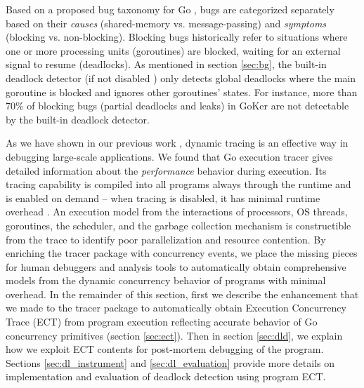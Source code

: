 Based on a proposed bug taxonomy for Go \cite{tu-concurrentBugs-asplos19}, bugs are categorized separately based on their \textit{causes} (shared-memory vs. message-passing) and \textit{symptoms} (blocking vs. non-blocking).
%
Blocking bugs historically refer to situations where one or more processing units (\eg goroutines) are blocked, waiting for an external signal to resume (\ie deadlocks).
%
As mentioned in section \ref{sec:bg}, the built-in deadlock detector (if not disabled \cite{go-netDeadlock}) only detects global deadlocks where the main goroutine is blocked and ignores other goroutines' states. For instance, more than 70\% of blocking bugs (partial deadlocks and leaks) in GoKer \cite{GoKer} are not detectable by the built-in deadlock detector.
%

As we have shown in our previous work \cite{parlot,difftrace}, dynamic tracing is an effective way in debugging large-scale applications.
%
We found that Go execution tracer \cite{go-cmd-trace} gives detailed information about the \textit{performance} behavior during execution.
%
Its tracing capability is compiled into all programs always through the runtime and is enabled on demand -- when tracing is disabled, it has minimal runtime overhead \cite{go-exec-tracer-doc}.
%
An execution model from the interactions of processors, OS threads, goroutines, the scheduler, and the garbage collection mechanism is constructible from the trace to identify poor parallelization and resource contention.
%
By enriching the tracer package with concurrency events, we place the missing pieces for human debuggers and analysis tools to automatically obtain comprehensive models from the dynamic concurrency behavior of programs with minimal overhead.
%
In the remainder of this section, first we describe the enhancement that we made to the tracer package to automatically obtain Execution Concurrency Trace (ECT) from program execution reflecting accurate behavior of Go concurrency primitives (section \ref{sec:ect}).
%
Then in section \ref{sec:dld}, we explain how we exploit ECT contents for post-mortem debugging of the program.
%
Sections \ref{sec:dl_instrument} and \ref{sec:dl_evaluation} provide more details on implementation and evaluation of deadlock detection using program ECT.



%


